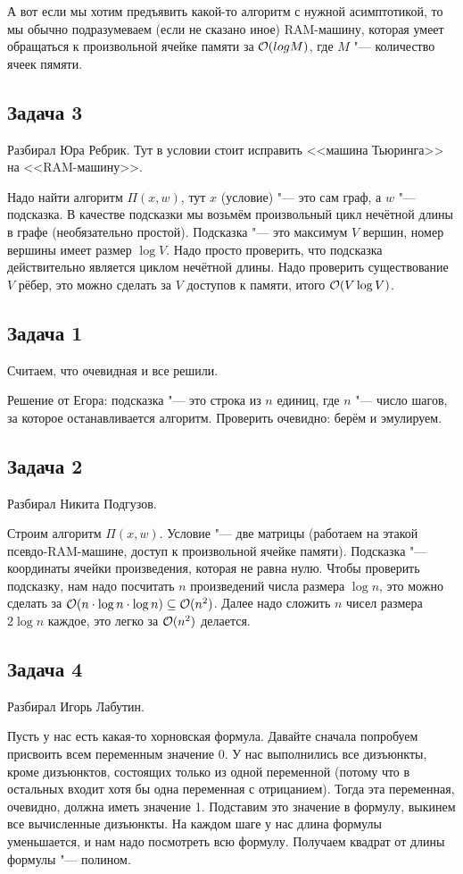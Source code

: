 	А вот если мы хотим предъявить какой-то алгоритм с нужной асимптотикой, то мы обычно
	подразумеваем (если не сказано иное) RAM-машину, которая умеет обращаться к произвольной
	ячейке памяти за $\mathcal O(log M)$, где $M$ "--- количество ячеек пямяти.

\subsection{Задача 3}
	Разбирал Юра Ребрик.
	Тут в условии стоит исправить <<машина Тьюринга>> на <<RAM-машину>>.

	Надо найти алгоритм $\Pi(x, w)$, тут $x$ (условие) "--- это сам граф, а $w$ "--- подсказка.
	В качестве подсказки мы возьмём произвольный цикл нечётной длины в графе (необязательно простой).
	Подсказка "--- это максимум $V$ вершин, номер вершины имеет размер $\log V$.
	Надо просто проверить, что подсказка действительно является циклом нечётной длины.
	Надо проверить существование $V$ рёбер, это можно сделать за $V$ доступов к памяти, итого $\mathcal O(V \log V)$.

\subsection{Задача 1}
	Считаем, что очевидная и все решили.

	Решение от Егора: подсказка "--- это строка из $n$ единиц, где $n$ "--- число
	шагов, за которое останавливается алгоритм.
	Проверить очевидно: берём и эмулируем.
	
\subsection{Задача 2}
	Разбирал Никита Подгузов.

	Строим алгоритм $\Pi(x, w)$.
	Условие "--- две матрицы (работаем на этакой псевдо-RAM-машине, доступ к произвольной ячейке памяти).
	Подсказка "--- координаты ячейки произведения, которая не равна нулю.
	Чтобы проверить подсказку, нам надо посчитать $n$ произведений числа размера $\log n$,
	это можно сделать за $\mathcal O(n\cdot\log n \cdot \log n) \subseteq \mathcal O(n^2)$.
	Далее надо сложить $n$ чисел размера $2\log n$ каждое, это легко за $\mathcal O(n^2)$ делается.

\subsection{Задача 4}
	Разбирал Игорь Лабутин.

	Пусть у нас есть какая-то хорновская формула.
	Давайте сначала попробуем присвоить всем переменным значение 0.
	У нас выполнились все дизъюнкты, кроме дизъюнктов, состоящих только из
	одной переменной (потому что в остальных входит хотя бы одна переменная с отрицанием).
	Тогда эта переменная, очевидно, должна иметь значение 1.
	Подставим это значение в формулу, выкинем все вычисленные дизъюнкты.
	На каждом шаге у нас длина формулы уменьшается, и нам надо посмотреть всю формулу.
	Получаем квадрат от длины формулы "--- полином.

